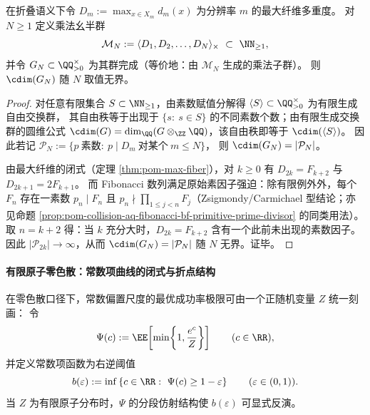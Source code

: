 \begin{theorem}[最大纤维生成乘法半群的圆维无界]\label{thm:xi-max-fiber-monoid-circle-dimension-unbounded}
在折叠语义下令 \(D_m:=\max_{x\in X_m}d_m(x)\) 为分辨率 \(m\) 的最大纤维多重度。
对 \(N\ge 1\) 定义乘法幺半群
\[
\mathcal{M}_N:=\langle D_1,D_2,\dots,D_N\rangle_{\times}\ \subset\ \NN_{\ge 1},
\]
并令 \(G_N\subset \QQ_{>0}^{\times}\) 为其群完成（等价地：由 \(\mathcal{M}_N\) 生成的乘法子群）。
则 \(\cdim(G_N)\) 随 \(N\) 取值无界。
\end{theorem}
\begin{proof}
对任意有限集合 \(S\subset\NN_{\ge 1}\)，由素数赋值分解得 \(\langle S\rangle\subset\QQ_{>0}^{\times}\) 为有限生成自由交换群，
其自由秩等于出现于 \(\{s:\ s\in S\}\) 的不同素数个数；由有限生成交换群的圆维公式 \(\cdim(G)=\dim_{\QQ}(G\otimes_{\ZZ}\QQ)\)，该自由秩即等于 \(\cdim(\langle S\rangle)\)。
因此若记
\(
\mathcal{P}_N:=\{p\ \text{素数}:\ p\mid D_m\ \text{对某个}\ m\le N\}
\)，
则 \(\cdim(G_N)=|\mathcal{P}_N|\)。
\par
由最大纤维的闭式（定理 \ref{thm:pom-max-fiber}），对 \(k\ge 0\) 有
\(
D_{2k}=F_{k+2}
\) 与
\(
D_{2k+1}=2F_{k+1}
\)。
而 Fibonacci 数列满足原始素因子强迫：除有限例外外，每个 \(F_n\) 存在一素数 \(p_n\mid F_n\) 且 \(p_n\nmid \prod_{1\le j<n}F_j\)（Zsigmondy/Carmichael 型结论；亦见命题 \ref{prop:pom-collision-aq-fibonacci-bf-primitive-prime-divisor} 的同类用法）。
取 \(n=k+2\) 得：当 \(k\) 充分大时，\(D_{2k}=F_{k+2}\) 含有一个此前未出现的素数因子。
因此 \(|\mathcal{P}_{2k}|\to\infty\)，从而 \(\cdim(G_N)=|\mathcal{P}_N|\) 随 \(N\) 无界。证毕。
\end{proof}

\paragraph{有限原子零色散：常数项曲线的闭式与折点结构}
在零色散口径下，常数偏置尺度的最优成功率极限可由一个正随机变量 \(Z\) 统一刻画：
令
\begin{equation}\label{eq:xi-zero-dispersion-psi-def}
\Psi(c):=\EE\!\left[\min\!\left\{1,\frac{e^{c}}{Z}\right\}\right]\qquad(c\in\RR),
\end{equation}
并定义常数项函数为右逆阈值
\begin{equation}\label{eq:xi-zero-dispersion-b-eps-def}
b(\varepsilon):=\inf\left\{c\in\RR:\ \Psi(c)\ge 1-\varepsilon\right\}\qquad(\varepsilon\in(0,1)).
\end{equation}
当 \(Z\) 为有限原子分布时，\(\Psi\) 的分段仿射结构使 \(b(\varepsilon)\) 可显式反演。

